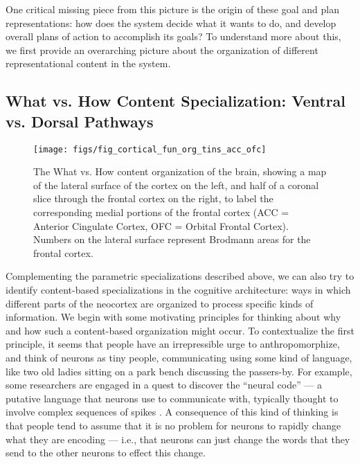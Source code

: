 \documentclass[11pt,twoside]{article}
\begin{document}
One critical missing piece from this picture is the origin of these goal and
plan representations: how does the system decide what it
wants to do, and develop overall plans of action to accomplish its goals?  To
understand more about this, we first provide an overarching picture about the
organization of different representational content in the system.

\subsection{What vs. How Content Specialization: Ventral vs. Dorsal Pathways}

\begin{figure}

  \centering\texttt{[image: figs/fig\_cortical\_fun\_org\_tins\_acc\_ofc]}
  \caption{\small The What vs. How content organization of the brain, showing a map of the lateral surface of the cortex on the left, and half of a coronal slice through the frontal cortex on the right, to label the corresponding medial portions of the frontal cortex (ACC = Anterior Cingulate Cortex, OFC = Orbital Frontal Cortex).  Numbers on the lateral surface represent Brodmann areas for the frontal cortex.}
  \label{fig.what_how}
\end{figure}

Complementing the parametric specializations described above, we can also try
to identify content-based specializations in the cognitive architecture: ways
in which different parts of the neocortex are organized to process specific
kinds of information.  We begin with some motivating principles for thinking
about why and how such a content-based organization might occur.  To
contextualize the first principle, it seems that people have an irrepressible
urge to anthropomorphize, and think of neurons as tiny people, communicating
using some kind of language, like two old ladies sitting on a park bench
discussing the passers-by.  For example, some researchers are engaged in a
quest to discover the ``neural code'' --- a putative language that neurons use
to communicate with, typically thought to involve complex sequences of spikes
\cite[e.g., ]{RiekeWarlandDeRuyterVanSteveninckEtAl96}.  A consequence of this
kind of thinking is that people tend to assume that it is no problem for
neurons to rapidly change what they are encoding
\cite[e.g.,]{Miller00,Duncan01} --- i.e., that neurons can just change the
words that they send to the other neurons to effect this change.
\end{document}
